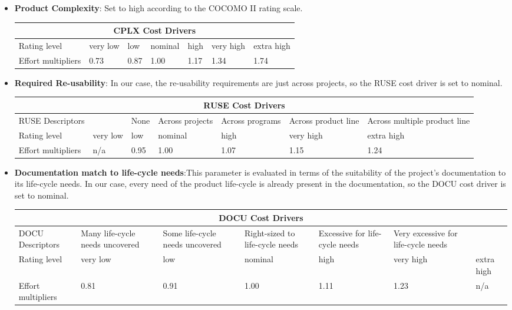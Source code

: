 \begin{itemize}
\item \textbf{Product Complexity}:
Set to high according to the COCOMO II rating scale.

\begin{longtable}{| m{}| m{} | m{} | m{} | m{} | m{} | m{}| }
\hline
\multicolumn{7}{c}{CPLX Cost Drivers}\\
\hline
\hline
Rating level & very low & low & nominal & high & very high & extra high \\
\hline
Effort multipliers & 0.73 & 0.87 & 1.00 & 1.17 & 1.34 & 1.74 \\
\hline
\end{longtable}

\item \textbf{Required Re-usability}:
In our case, the re-usability requirements are just across projects, so the RUSE cost driver is set to nominal.

\begin{longtable}{| m{}| m{} | m{} | m{} | m{} | m{} | m{}| }
\hline
\multicolumn{7}{c}{RUSE Cost Drivers}\\
\hline
\hline
RUSE Descriptors &  & None & Across projects & Across programs & Across product line & Across multiple product line\\
\hline
Rating level & very low & low & nominal & high & very high & extra high \\
\hline
Effort multipliers & n/a & 0.95 & 1.00 & 1.07 & 1.15 & 1.24 \\
\hline
\end{longtable}

\item \textbf{Documentation match to life-cycle needs}:This parameter is evaluated in terms of the suitability of the project's documentation to its life-cycle needs. In our case, every need
of the product life-cycle is already present in the documentation,
so the DOCU cost driver is set to nominal.

\begin{longtable}{| m{}| m{} | m{} | m{} | m{} | m{} | m{}| }
\hline
\multicolumn{7}{c}{DOCU Cost Drivers}\\
\hline
\hline
DOCU Descriptors & Many life-cycle needs uncovered & Some life-cycle needs uncovered & Right-sized to life-cycle needs & Excessive for life-cycle needs & Very excessive for life-cycle needs & \\
\hline
Rating level & very low & low & nominal & high & very high & extra high \\
\hline
Effort multipliers & 0.81 & 0.91 & 1.00 & 1.11 & 1.23 & n/a \\
\hline
\end{longtable}


\end{itemize}
